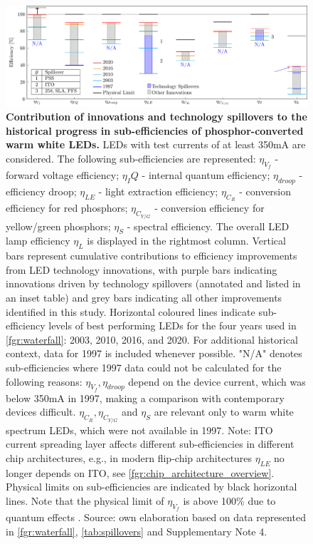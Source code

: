 \documentclass[parskip=full]{article}
\begin{document}
\begin{figure}[h!]
 \centering
 \includegraphics[width=\textwidth]{figures/breakthroughs_efficiency.pdf}
 \caption{\textbf{Contribution of innovations and technology spillovers to the historical progress in sub-efficiencies of phosphor-converted warm white LEDs.} LEDs with test currents of at least 350mA are considered. The following sub-efficiencies are represented: $\eta_{V_f}$ - forward voltage efficiency; $\eta_IQ$ - internal quantum efficiency; $\eta_{droop}$ - efficiency droop; $\eta_{LE}$ - light extraction efficiency; $\eta_{C_R}$ - conversion efficiency for red phosphors; $\eta_{C_{Y/G}}$ - conversion efficiency for yellow/green phosphors; $\eta_S$ - spectral efficiency. The overall LED lamp efficiency $\eta_L$ is displayed in the rightmost column. Vertical bars represent cumulative contributions to efficiency improvements from LED technology innovations, with purple bars indicating innovations driven by technology spillovers (annotated and listed in an inset table) and grey bars indicating all other improvements identified in this study. Horizontal coloured lines indicate sub-efficiency levels of best performing LEDs for the four years used in \cref{fgr:waterfall}: 2003, 2010, 2016, and 2020. For additional historical context, data for 1997 is included whenever possible. "N/A" denotes sub-efficiencies where 1997 data could not be calculated for the following reasons: $\eta_{V_f}, \eta_{droop}$ depend on the device current, which was below 350mA in 1997, making a comparison with contemporary devices difficult. $\eta_{C_R}, \eta_{C_{Y/G}}$ and $\eta_S$ are relevant only to warm white spectrum LEDs, which were not available in 1997. Note: ITO current spreading layer affects different sub-efficiencies in different chip architectures, e.g., in modern flip-chip architectures $\eta_{LE}$ no longer depends on ITO, see \cref{fgr:chip_architecture_overview}. Physical limits on sub-efficiencies are indicated by black horizontal lines. Note that the physical limit of $\eta_{V_f}$ is above 100\% due to quantum effects \cite{david2016electrical}. Source: own elaboration based on data represented in \cref{fgr:waterfall}, \cref{tab:spillovers} and Supplementary Note 4.}
 \label{fgr:breakthroughs_efficiency}
\end{figure}
\end{document}
